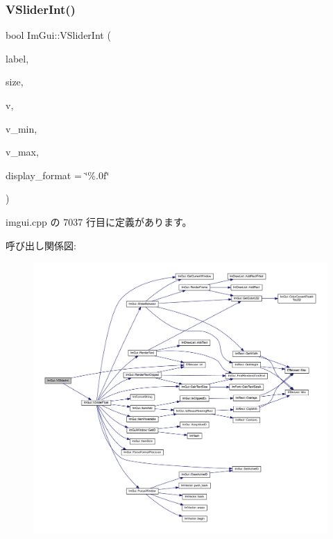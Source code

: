 \subsubsection{\texorpdfstring{V\+Slider\+Int()}{VSliderInt()}}
{\footnotesize\ttfamily bool Im\+Gui\+::\+V\+Slider\+Int (\begin{DoxyParamCaption}\item[{const char $\ast$}]{label,  }\item[{const \mbox{\hyperlink{struct_im_vec2}{Im\+Vec2}} \&}]{size,  }\item[{int $\ast$}]{v,  }\item[{int}]{v\+\_\+min,  }\item[{int}]{v\+\_\+max,  }\item[{const char $\ast$}]{display\+\_\+format = {\ttfamily \char`\"{}\%.0f\char`\"{}} }\end{DoxyParamCaption})}



 imgui.\+cpp の 7037 行目に定義があります。

呼び出し関係図\+:\nopagebreak
\begin{figure}[H]
\begin{center}
\leavevmode
\includegraphics[width=350pt]{namespace_im_gui_a7a8e53471ef7f8b7ad28abea35a40bf4_cgraph}
\end{center}
\end{figure}
